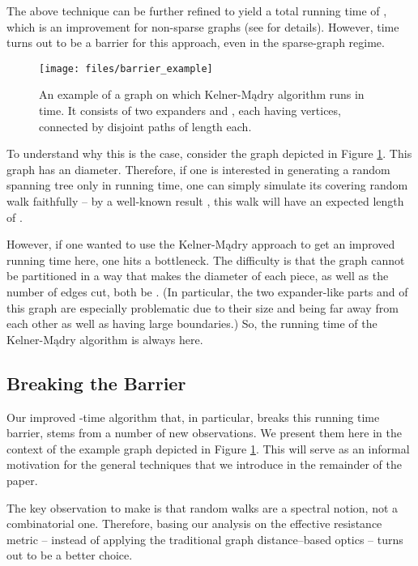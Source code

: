 \documentclass[11pt, letterpaper]{article}
\begin{document}
The above technique can be further refined to yield a total running time of , which is an improvement for non-sparse graphs (see \cite{KelnerM09} for details). However,  time turns out to be a barrier for this approach, even in the sparse-graph regime. 

\begin{figure}[ht]
\centering
\vspace{8pt}
\texttt{[image: files/barrier\_example]}
\vspace{8pt}
\caption{An example of a graph on which Kelner-Mądry algorithm runs in  time. It consists of two expanders  and , each having  vertices, connected by  disjoint paths of length  each.} 
\label{fig:barrier_example}
\end{figure}


To understand why this is the case, consider the graph depicted in Figure \ref{fig:barrier_example}. This graph has an  diameter. Therefore, if one is interested in generating a random spanning tree only in  running time, one can simply simulate its covering random walk faithfully -- by a well-known result \cite{AleliunasKLLR79}, this walk will have an expected length of .

However, if one wanted to use the Kelner-Mądry approach to get an improved running time here, one hits a bottleneck. The difficulty is that the graph cannot be partitioned in a way that makes the diameter  of each piece, as well as the number  of edges cut, both be . (In particular, the two expander-like parts  and  of this graph are especially problematic due to their size and being far away from each other as well as having large boundaries.) So, the running time of the Kelner-Mądry algorithm is always  here.

\subsection{Breaking the  Barrier}

Our improved -time algorithm that, in particular, breaks this  running time barrier, stems from a number of new observations. We present them here in the context of the example graph depicted in Figure \ref{fig:barrier_example}. This will serve as an informal motivation for the general techniques that we introduce in the remainder of the paper.


The key observation to make is that random walks are a spectral notion, not a combinatorial one. Therefore, basing our analysis on the effective resistance metric -- instead of applying the traditional graph distance--based optics -- turns out to be a better choice. 
\end{document}
